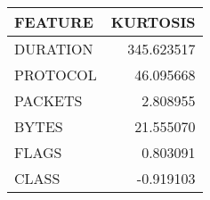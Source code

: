 \begin{tabular}{lr}
\toprule
 FEATURE &   KURTOSIS \\
\midrule
DURATION & 345.623517 \\
PROTOCOL &  46.095668 \\
 PACKETS &   2.808955 \\
   BYTES &  21.555070 \\
   FLAGS &   0.803091 \\
   CLASS &  -0.919103 \\
\bottomrule
\end{tabular}
